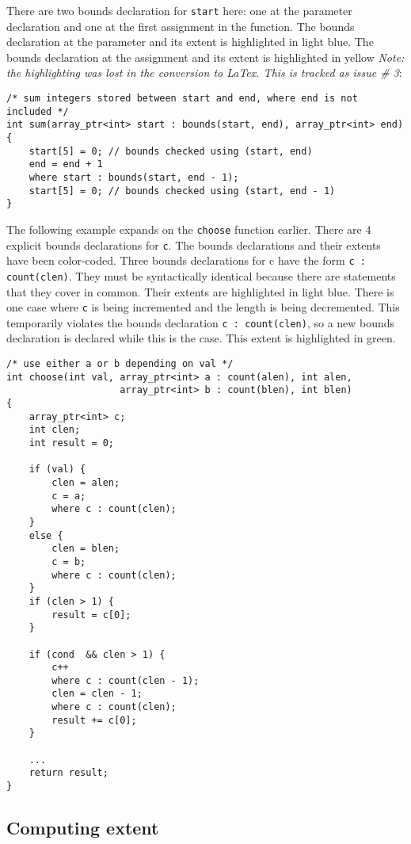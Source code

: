 There are two bounds declaration for \texttt{start} here: one at the
parameter declaration and one at the first assignment in the function.
The bounds declaration at the parameter and its extent is highlighted in
light blue. The bounds declaration at the assignment and its extent is
highlighted in yellow {\em Note: the highlighting was lost in the
conversion to LaTex.  This is tracked as issue \# 3}:

\begin{verbatim}
/* sum integers stored between start and end, where end is not included */
int sum(array_ptr<int> start : bounds(start, end), array_ptr<int> end)
{ 
    start[5] = 0; // bounds checked using (start, end)
    end = end + 1
    where start : bounds(start, end - 1);
    start[5] = 0; // bounds checked using (start, end - 1)
}
\end{verbatim}

The following example expands on the \texttt{choose} function earlier. There are
4 explicit bounds declarations for \texttt{c}. The bounds declarations
and their extents have been color-coded. Three bounds declarations for c
have the form \texttt{c : count(clen)}. They must be syntactically
identical because there are statements that they cover in common. Their
extents are highlighted in light blue. There is one case where
\texttt{c} is being incremented and the length is being decremented.
This temporarily violates the bounds declaration \texttt{c :
count(clen)}, so a new bounds declaration is declared while this is the
case. This extent is highlighted in green.

\begin{verbatim}
/* use either a or b depending on val */
int choose(int val, array_ptr<int> a : count(alen), int alen,
                    array_ptr<int> b : count(blen), int blen) 
{
    array_ptr<int> c;
    int clen;
    int result = 0;

    if (val) {
        clen = alen;
        c = a;
        where c : count(clen);
    }
    else {
        clen = blen;
        c = b;
        where c : count(clen);
    }
    if (clen > 1) {
        result = c[0];
    }

    if (cond  && clen > 1) {
        c++
        where c : count(clen - 1);
        clen = clen - 1;
        where c : count(clen);
        result += c[0];
    }
    
    ...
    return result;
}
\end{verbatim}

\subsection{Computing extent}
\label{section:computing-extent}

